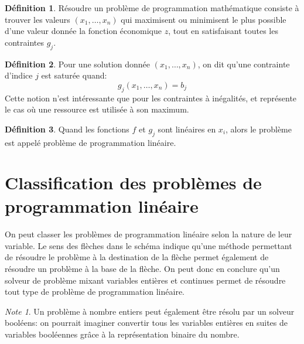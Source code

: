 \documentclass[a4paper]{report}
\theoremstyle{definition}
\newtheorem*{definition}{Définition}
\theoremstyle{remark}
\newtheorem*{note}{Note}
\theoremstyle{plain}
\begin{document}
\begin{definition}
Résoudre un problème de programmation mathématique consiste à trouver les
valeurs \((x_1,\dots,x_n)\) qui maximisent ou minimisent le plus
possible d'une valeur donnée la fonction économique \(z\),
tout en satisfaisant toutes les contraintes \(g_j\).
\end{definition}

\begin{definition}
Pour une solution donnée \((x_1,\dots,x_n)\), on dit qu'une contrainte
d'indice \(j\) est saturée quand:
\[g_j(x_1,\dots,x_n)=b_j\]
Cette notion n'est intéressante que pour les contraintes à inégalités, et
représente le cas où une ressource est utilisée à son maximum.
\end{definition}

\begin{definition}
Quand les fonctions \(f\) et \(g_j\) sont linéaires en \(x_i\), alors le
problème est appelé problème de programmation linéaire.
\end{definition}

\section{Classification des problèmes de programmation linéaire}

\paragraph{}On peut classer les problèmes de programmation linéaire selon la
nature de leur variable. Le sens des flèches dans le schéma indique qu'une
méthode permettant de résoudre le problème à la destination de la flèche permet
également de résoudre un problème à la base de la flèche. On peut donc en
conclure qu'un solveur de problème mixant variables entières et continues permet
de résoudre tout type de problème de programmation linéaire.
\begin{note}
Un problème à nombre entiers peut également être résolu par un
solveur booléens: on pourrait imaginer convertir tous les variables entières en
suites de variables booléennes grâce à la représentation binaire du nombre.
\end{note}
\end{document}
